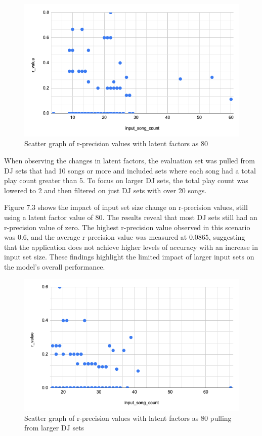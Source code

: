 \begin{figure}[H]
	\includegraphics[scale=0.6]{images/80_little_sets}
	\centering
	\caption{Scatter graph of r-precision values with latent factors as 80} 
\end{figure}


When observing the changes in latent factors, the evaluation set was pulled from DJ sets that had 10 songs or more and included sets where each song had a total play count greater than 5. To focus on larger DJ sets, the total play count was lowered to 2 and then filtered on just DJ sets with over 20 songs.

Figure 7.3 shows the impact of input set size change on r-precision values, still using a latent factor value of 80. The results reveal that most DJ sets still had an r-precision value of zero. The highest r-precision value observed in this scenario was 0.6, and the average r-precision value was measured at 0.0865, suggesting that the application does not achieve higher levels of accuracy with an increase in input set size. These findings highlight the limited impact of larger input sets on the model's overall performance.

\begin{figure}[H]
	\includegraphics[scale=0.6]{images/80_big_sets}
	\centering
	\caption{Scatter graph of r-precision values with latent factors as 80 pulling from larger DJ sets} 
\end{figure}


